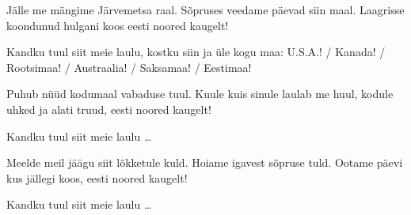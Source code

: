 J\"alle me m\"angime J\"arvemetsa raal.
S\~opruses veedame p\"aevad siin maal.
Laagrisse koondunud hulgani koos
eesti noored kaugelt!

Kandku tuul siit meie laulu,
kostku siin ja \"ule kogu maa:
	U.S.A.! / Kanada! /	Rootsimaa! / Austraalia! / Saksamaa! / Eestimaa!

Puhub n\"u\"ud kodumaal vabaduse tuul.
Kuule kuis sinule laulab me huul,
kodule uhked ja alati truud,
eesti noored kaugelt!

Kandku tuul siit meie laulu \ldots

Meelde meil j\"a\"agu siit l\~okketule kuld.
Hoiame igavest s\~opruse tuld.
Ootame p\"aevi kus j\"allegi koos,
eesti noored kaugelt!

Kandku tuul siit meie laulu \ldots